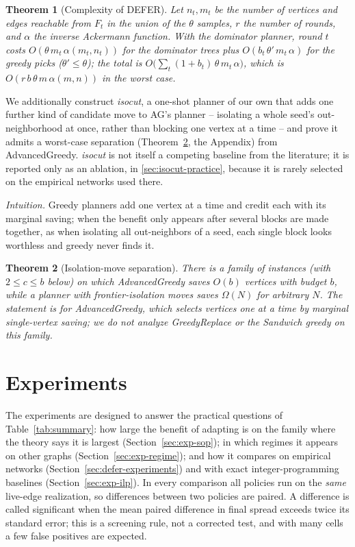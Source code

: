 \documentclass[preprint,11pt]{elsarticle}
\newtheorem{theorem}{Theorem}
\theoremstyle{definition}
\theoremstyle{remark}
\begin{document}
\begin{theorem}[Complexity of DEFER]\label{thm:defer-complexity}
Let $n_t,m_t$ be the number of vertices and edges reachable from $F_t$ in
the union of the $\theta$ samples, $r$ the number of rounds, and $\alpha$
the inverse Ackermann function. With the dominator planner, round $t$ costs
$O(\theta\,m_t\,\alpha(m_t,n_t))$ for the dominator trees plus
$O(b_t\,\theta'\,m_t\,\alpha)$ for the greedy picks ($\theta'\le\theta$);
the total is $O\bigl(\sum_t(1+b_t)\,\theta\,m_t\,\alpha\bigr)$, which is
$O(r\,b\,\theta\,m\,\alpha(m,n))$ in the worst case.
\end{theorem}

We additionally construct \emph{isocut}, a one-shot planner of our own
that adds one further kind of candidate move to AG's planner --
isolating a whole seed's out-neighborhood at once, rather than blocking
one vertex at a time -- and prove it admits a worst-case separation
(Theorem~\ref{thm:isocut-separation}, the Appendix) from AdvancedGreedy. \emph{isocut} is not itself a competing baseline from the
literature; it is reported only as an ablation, in
\ref{sec:isocut-practice}, because it is rarely selected
on the empirical networks used there.

\emph{Intuition.} Greedy planners add one vertex at a time and credit each
with its marginal saving; when the benefit only appears after several
blocks are made together, as when isolating all out-neighbors of a seed, each
single block looks worthless and greedy never finds it.

\begin{theorem}[Isolation-move separation]\label{thm:isocut-separation}
There is a family of instances (with $2\le c\le b$ below) on which AdvancedGreedy saves $O(b)$ vertices with budget $b$,
while a planner with frontier-isolation moves saves $\Omega(N)$ for
arbitrary $N$. The statement is for AdvancedGreedy, which selects vertices one at a time by marginal single-vertex saving; we do not analyze GreedyReplace or the Sandwich greedy on this family.
\end{theorem}

\section{Experiments}\label{sec:experiments}

The experiments are designed to answer the practical questions of Table~\ref{tab:summary}: how large the benefit of adapting is on the family where the theory says it is largest (Section~\ref{sec:exp-sop}); in which regimes it appears on other graphs (Section~\ref{sec:exp-regime}); and how it compares on empirical networks (Section~\ref{sec:defer-experiments}) and with exact integer-programming baselines (Section~\ref{sec:exp-ilp}). In every comparison all policies run on the \emph{same} live-edge realization, so differences between two policies are paired. A difference is called significant when the mean paired difference in final spread exceeds twice its standard error; this is a screening rule, not a corrected test, and with many cells a few false positives are expected.
\end{document}
